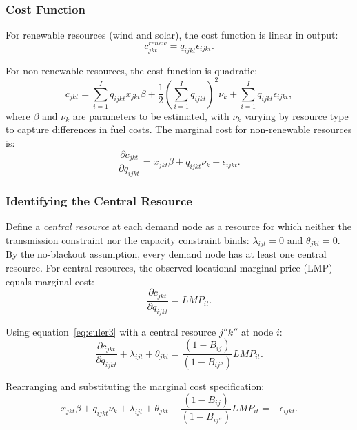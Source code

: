 \documentclass[12pt]{article}
\begin{document}
\subsubsection{Cost Function}

For renewable resources (wind and solar), the cost function is linear in output:
\begin{equation}
    c_{jkt}^{renew} = q_{ijkt} \epsilon_{ijkt}.
\end{equation}

For non-renewable resources, the cost function is quadratic:
\begin{equation}\label{eq:cost_nonrenew}
    c_{jkt} = \sum_{i=1}^{I} q_{ijkt} x_{jkt} \beta + \frac{1}{2} \left(\sum_{i=1}^{I} q_{ijkt}\right)^2 \nu_k + \sum_{i=1}^{I} q_{ijkt} \epsilon_{ijkt},
\end{equation}
where $\beta$ and $\nu_k$ are parameters to be estimated, with $\nu_k$ varying by resource type to capture differences in fuel costs. The marginal cost for non-renewable resources is:
\begin{equation}\label{eq:mc}
    \frac{\partial c_{jkt}}{\partial q_{ijkt}} = x_{jkt} \beta + q_{ijkt} \nu_k + \epsilon_{ijkt}.
\end{equation}

\subsubsection{Identifying the Central Resource}

Define a \emph{central resource} at each demand node as a resource for which neither the transmission constraint nor the capacity constraint binds: $\lambda_{ijt} = 0$ and $\theta_{jkt} = 0$. By the no-blackout assumption, every demand node has at least one central resource. For central resources, the observed locational marginal price (LMP) equals marginal cost:
\begin{equation}
    \frac{\partial c_{jkt}}{\partial q_{ijkt}} = LMP_{it}.
\end{equation}

Using equation~\eqref{eq:euler3} with a central resource $j''k''$ at node $i$:
\begin{equation}\label{eq:central}
    \frac{\partial c_{jkt}}{\partial q_{ijkt}} + \lambda_{ijt} + \theta_{jkt} = \frac{(1 - B_{ij})}{(1 - B_{ij''})} LMP_{it}.
\end{equation}

Rearranging and substituting the marginal cost specification:
\begin{equation}\label{eq:error_eq}
    x_{jkt} \beta + q_{ijkt} \nu_k + \lambda_{ijt} + \theta_{jkt} - \frac{(1 - B_{ij})}{(1 - B_{ij''})} LMP_{it} = -\epsilon_{ijkt}.
\end{equation}
\end{document}

